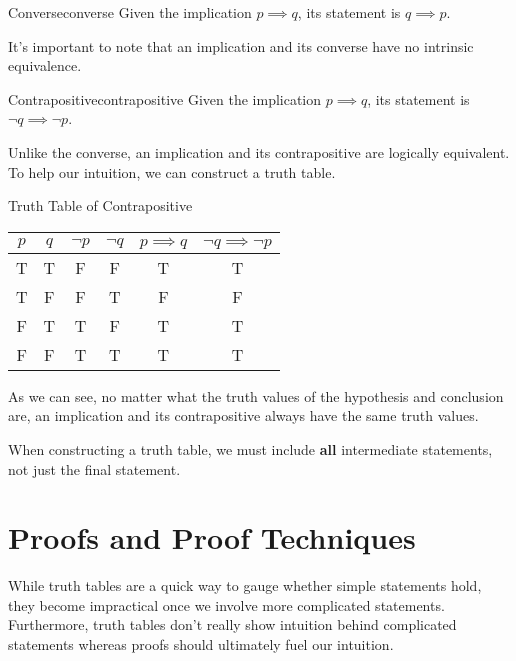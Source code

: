 \documentclass[12pt]{report}
\begin{document}
\begin{dfnbox}{Converse}{converse}
    Given the implication $p \implies q$, its  statement is $q \implies p$.
\end{dfnbox}

It's important to note that an implication and its converse have no intrinsic equivalence.

\begin{dfnbox}{Contrapositive}{contrapositive}
    Given the implication $p \implies q$, its  statement is $\neg q \implies \neg p$.
\end{dfnbox}

Unlike the converse, an implication and its contrapositive are logically equivalent. To help our intuition, we can construct a truth table.

\begin{exbox}{Truth Table of Contrapositive}{}
    \begin{center}\begin{tabular}{c | c || c | c | c | c}
        $p$ & $q$ & $\neg p$ & $\neg q$ & $p \implies q$ & $\neg q \implies \neg p$ \\ \hline
        T & T & F & F & T & T \\
        T & F & F & T & F & F \\
        F & T & T & F & T & T \\
        F & F & T & T & T & T
    \end{tabular}\end{center}
\end{exbox}

As we can see, no matter what the truth values of the hypothesis and conclusion are, an implication and its contrapositive always have the same truth values.

\begin{notebox}
    When constructing a truth table, we must include \textbf{all} intermediate statements, not just the final statement.
\end{notebox}



\section{Proofs and Proof Techniques}
While truth tables are a quick way to gauge whether simple statements hold, they become impractical once we involve more complicated statements. Furthermore, truth tables don't really show intuition behind complicated statements whereas proofs should ultimately fuel our intuition.
\end{document}
